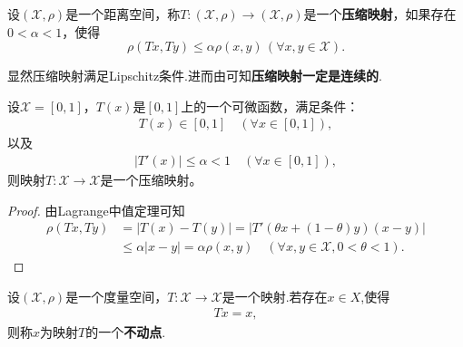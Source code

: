 \documentclass[../../main.tex]{subfiles}%
\begin{document}
\begin{definition}
设$(\mathscr{X},\rho)$是一个距离空间，称$T:(\mathscr{X},\rho) \to (\mathscr{X},\rho)$是一个\textbf{压缩映射}，如果存在$0 < \alpha < 1$，使得$$\rho(Tx,Ty) \leqslant \alpha\rho(x,y)\,(\forall x,y \in \mathscr{X}).$$
\end{definition}
\begin{remark}
显然压缩映射满足Lipschitz条件.进而由可知\textbf{压缩映射一定是连续的}.
\end{remark}

\begin{example}
设$\mathscr{X} = [0,1]$，$T(x)$是$[0,1]$上的一个可微函数，满足条件：
\begin{align}
\label{eq:1.1.8}
T(x) \in [0,1] \quad (\forall x \in [0,1]),
\end{align}
以及
\begin{align}
\label{eq:1.1.9}
|T'(x)| \leqslant \alpha < 1 \quad (\forall x \in [0,1]),
\end{align}
则映射$T:\mathscr{X} \to \mathscr{X}$是一个压缩映射。
\end{example}
\begin{proof}
由Lagrange中值定理可知
\begin{align*}
\rho(Tx,Ty) &= |T(x) - T(y)|= |T'(\theta x + (1 - \theta)y)(x - y)| \\
&\leqslant \alpha|x - y| = \alpha\rho(x,y) \quad (\forall x,y \in \mathscr{X}, 0 < \theta < 1).
\end{align*}
\end{proof}

\begin{definition}[不动点]
设$(\mathscr{X},\rho)$是一个度量空间，$T:\mathscr{X}\to \mathscr{X}$是一个映射.若存在$x\in X$,使得
\begin{align*}
Tx=x,
\end{align*}
则称$x$为映射$T$的一个\textbf{不动点}.
\end{definition}
\end{document}

